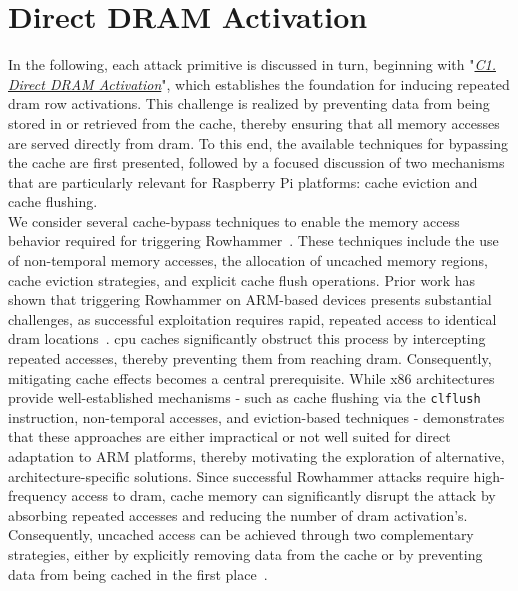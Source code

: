 \section{Direct DRAM Activation} \label{sec:uncached}
    In the following, each attack primitive is discussed in turn, beginning with "\textit{\hyperref[ch:uncached]{C1. Direct DRAM Activation}}", which 
    establishes the foundation for inducing repeated \gls{dram} row activations. This challenge 
    is realized by preventing data from being stored in or retrieved from the cache, thereby ensuring 
    that all memory accesses are served directly from \gls{dram}. To this end, the available techniques for 
    bypassing the cache are first presented, followed by a focused discussion of two mechanisms that 
    are particularly relevant for Raspberry Pi platforms: cache eviction and cache flushing.
    \\
    We consider several cache-bypass techniques to enable the memory access behavior required for triggering 
    Rowhammer~\cite{presRHAttacksWalkthrough, toolRowhammering}. These techniques include the use of non-temporal memory 
    accesses, the allocation of uncached memory regions, cache eviction strategies, and explicit cache 
    flush operations. Prior work has shown that triggering Rowhammer on ARM-based devices presents 
    substantial challenges, as successful exploitation requires rapid, repeated access to identical 
    \gls{dram} locations~\cite{paperTriggeringRHHardwareFault}. \gls{cpu} caches significantly obstruct this process by intercepting repeated accesses, 
    thereby preventing them from reaching \gls{dram}. Consequently, mitigating cache effects becomes a central 
    prerequisite. While x86 architectures provide well-established mechanisms - such as cache flushing 
    via the \texttt{clflush} instruction, non-temporal accesses, and eviction-based techniques - \cite{paperTriggeringRHHardwareFault} demonstrates 
    that these approaches are either impractical or not well suited for direct adaptation to ARM platforms, 
    thereby motivating the exploration of alternative, architecture-specific solutions. Since successful 
    Rowhammer attacks require high-frequency access to \gls{dram}, cache memory can significantly disrupt the 
    attack by absorbing repeated accesses and reducing the number of \gls{dram} activation's. Consequently, 
    uncached access can be achieved through two complementary strategies, either by explicitly removing 
    data from the cache or by preventing data from being cached in the first place~\cite{toolRPI3}.

